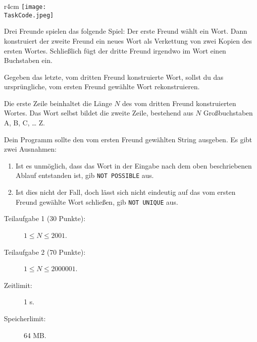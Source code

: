 \documentclass{boi2014}
\renewcommand{\TaskCode}{friends}
\begin{document}
    \begin{wrapfigure}{r}{4cm}
        \vspace{-24pt}
		\texttt{[image: \\TaskCode.jpeg]}
	\end{wrapfigure}
    Drei Freunde spielen das folgende Spiel:
    Der erste Freund wählt ein Wort.
    Dann konstruiert der zweite Freund ein neues Wort als Verkettung von zwei Kopien des ersten Wortes.
    Schließlich fügt der dritte Freund irgendwo im Wort einen Buchstaben ein.

    \Task
    Gegeben das letzte, vom dritten Freund konstruierte Wort, sollst du das ursprüngliche, vom ersten Freund gewählte Wort rekonstruieren.

    \Input
    Die erste Zeile beinhaltet die Länge $N$ des vom dritten Freund konstruierten Wortes.
    Das Wort selbst bildet die zweite Zeile, bestehend aus $N$ Großbuchstaben A, B, C, \ldots{} Z.

    \Output
    Dein Programm sollte den vom ersten Freund gewählten String ausgeben.
    Es gibt zwei Ausnahmen:
    \begin{enumerate}
        \item Ist es unmöglich, dass das Wort in der Eingabe nach dem oben beschriebenen Ablauf entstanden ist, gib {\tt NOT POSSIBLE} aus.
        \item Ist dies nicht der Fall, doch lässt sich nicht eindeutig auf das vom ersten Freund gewählte Wort schließen, gib {\tt NOT
        UNIQUE} aus.
    \end{enumerate}
    

    \Examples


    \Scoring

    \begin{description}
        \item[Teilaufgabe 1 (30 Punkte):] $1 \le N \le 2001$.
        \item[Teilaufgabe 2 (70 Punkte):] $1 \le N \le 2000001$.
    \end{description}

    \Constraints

    \begin{description}
        \item[Zeitlimit:] 1 s.
        \item[Speicherlimit:] 64 MB.
    \end{description}
\end{document}
